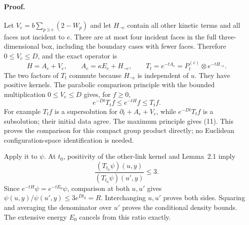 \documentclass[11pt]{article}
\begin{document}
\paragraph{Proof.}
Let $V_e=b\sum_{p\ni e}(2-W_p)$ and let $H_{\neg e}$ contain all
other kinetic terms and all faces not incident to $e$. There are at
most four incident faces in the full three-dimensional box, including
the boundary cases with fewer faces. Therefore $0\leq V_e\leq D$,
and the exact operator is
\[
 H=A_e+V_e,\qquad A_e=\kappa E_e+H_{\neg e},\qquad
 T_t=e^{-tA_e}=P_t^{(e)}\otimes e^{-tH_{\neg e}}.
\]
The two factors of $T_t$ commute because $H_{\neg e}$ is independent
of $u$. They have positive kernels. The parabolic comparison principle
with the bounded multiplication $0\leq V_e\leq D$ gives, for $f\geq0$,
\begin{equation}\label{eq:comparison}
 e^{-Dt}T_tf\leq e^{-tH}f\leq T_tf.
\end{equation}
For example $T_tf$ is a supersolution for
$\partial_t+A_e+V_e$, while $e^{-Dt}T_tf$ is a subsolution; their
initial data agree. The maximum principle gives (11).
This proves the comparison for this compact group product directly;
no Euclidean configuration-space identification is needed.

Apply it to $\psi$. At $t_0$, positivity of the other-link kernel and
Lemma~2.1 imply
\[
 \frac{(T_{t_0}\psi)(u,y)}{(T_{t_0}\psi)(u',y)}\leq3.
\]
Since $e^{-tH}\psi=e^{-tE_0}\psi$, comparison at both $u,u'$ gives
$\psi(u,y)/\psi(u',y)\leq3e^{Dt_0}=R$.
Interchanging $u,u'$ proves both sides. Squaring and averaging the
denominator over $u'$ proves the conditional density bounds.
The extensive energy $E_0$ cancels from this ratio exactly.
\end{document}
